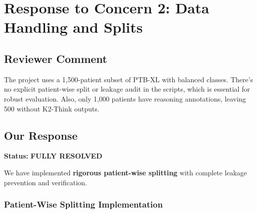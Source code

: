 \documentclass[11pt]{article}
\begin{document}
\newpage
\section{Response to Concern 2: Data Handling and Splits}

\subsection{Reviewer Comment}
\begin{tcolorbox}[colback=red!5!white,colframe=red!75!black,title=Reviewer Concern]
The project uses a 1,500-patient subset of PTB-XL with balanced classes. There's no explicit patient-wise split or leakage audit in the scripts, which is essential for robust evaluation. Also, only 1,000 patients have reasoning annotations, leaving 500 without K2-Think outputs.
\end{tcolorbox}

\subsection{Our Response}

\textbf{Status:} \textcolor{green!70!black}{\textbf{FULLY RESOLVED}}

We have implemented \textbf{rigorous patient-wise splitting} with complete leakage prevention and verification.

\subsubsection{Patient-Wise Splitting Implementation}
\end{document}
